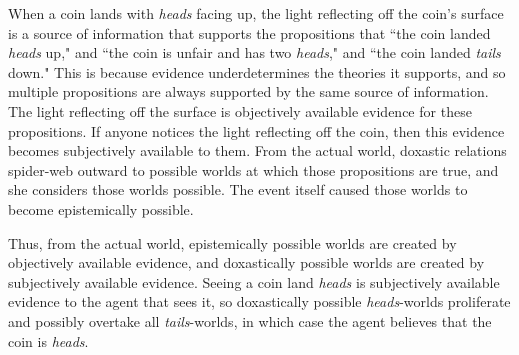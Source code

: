 When a coin lands with \emph{heads} facing up, the light reflecting off the coin's surface is a source of information that supports the propositions that ``the coin landed \emph{heads} up," and ``the coin is unfair and has two \emph{heads}," and ``the coin landed \emph{tails} down." This is because evidence underdetermines the theories it supports, and so multiple propositions are always supported by the same source of information. The light reflecting off the surface is objectively available evidence for these propositions. If anyone notices the light reflecting off the coin, then this evidence becomes subjectively available to them. From the actual world, doxastic relations spider-web outward to possible worlds at which those propositions are true, and she considers those worlds possible. The event itself caused those worlds to become epistemically possible.


Thus, from the actual world, epistemically possible worlds are created by objectively available evidence, and doxastically possible worlds are created by subjectively available evidence. Seeing a coin land \emph{heads} is subjectively available evidence to the agent that sees it, so doxastically possible \emph{heads}-worlds proliferate and possibly overtake all \emph{tails}-worlds, in which case the agent believes that the coin is \emph{heads}. 


